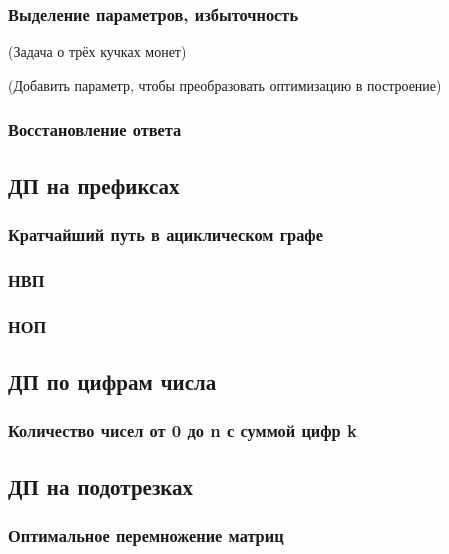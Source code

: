 \documentclass[a4paper,12pt]{article}
\begin{document}
      \subsubsection{Выделение параметров, избыточность}

      (Задача о трёх кучках монет)

      (Добавить параметр, чтобы преобразовать оптимизацию в построение)

      \subsubsection{Восстановление ответа}

    \subsection{ДП на префиксах}

      \subsubsection{Кратчайший путь в ациклическом графе}

      \subsubsection{НВП}

      \subsubsection{НОП}
    
    \subsection{ДП по цифрам числа}

      \subsubsection{Количество чисел от 0 до n с суммой цифр k}
    
    \subsection{ДП на подотрезках}

      \subsubsection{Оптимальное перемножение матриц}
\end{document}
